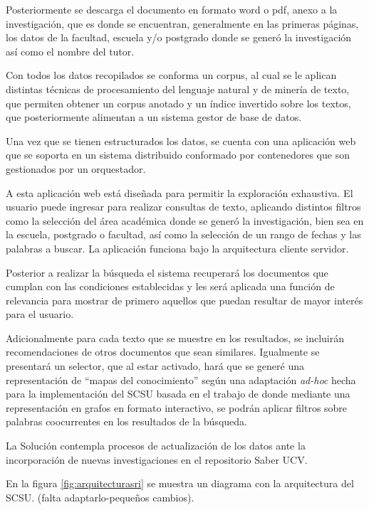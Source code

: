 \documentclass[
  10,
  openany]{book}
\begin{document}
Posteriormente se descarga el documento en formato word o pdf, anexo a la investigación, que es donde se encuentran, generalmente en las primeras páginas, los datos de la facultad, escuela y/o postgrado donde se generó la investigación así como el nombre del tutor.

Con todos los datos recopilados se conforma un corpus, al cual se le aplican distintas técnicas de procesamiento del lenguaje natural y de minería de texto, que permiten obtener un corpus anotado y un índice invertido sobre los textos, que posteriormente alimentan a un sistema gestor de base de datos.

Una vez que se tienen estructurados los datos, se cuenta con una aplicación web que se soporta en un sistema distribuido conformado por contenedores que son gestionados por un orquestador.

A esta aplicación web está diseñada para permitir la exploración exhaustiva. El usuario puede ingresar para realizar consultas de texto, aplicando distintos filtros como la selección del área académica donde se generó la investigación, bien sea en la escuela, postgrado o facultad, así como la selección de un rango de fechas y las palabras a buscar. La aplicación funciona bajo la arquitectura cliente servidor.

Posterior a realizar la búsqueda el sistema recuperará los documentos que cumplan con las condiciones establecidas y les será aplicada una función de relevancia para mostrar de primero aquellos que puedan resultar de mayor interés para el usuario.

Adicionalmente para cada texto que se muestre en los resultados, se incluirán recomendaciones de otros documentos que sean similares. Igualmente se presentará un selector, que al estar activado, hará que se generé una representación de ``mapas del conocimiento'' según una adaptación \emph{ad-hoc} hecha para la implementación del SCSU basada en el trabajo de \citep{dueñas2011} donde mediante una representación en grafos en formato interactivo, se podrán aplicar filtros sobre palabras coocurrentes en los resultados de la búsqueda.

La Solución contempla procesos de actualización de los datos ante la incorporación de nuevas investigaciones en el repositorio Saber UCV.

En la figura \ref{fig:arquitecturasri} se muestra un diagrama con la arquitectura del SCSU. (falta adaptarlo-pequeños cambios).
\end{document}
